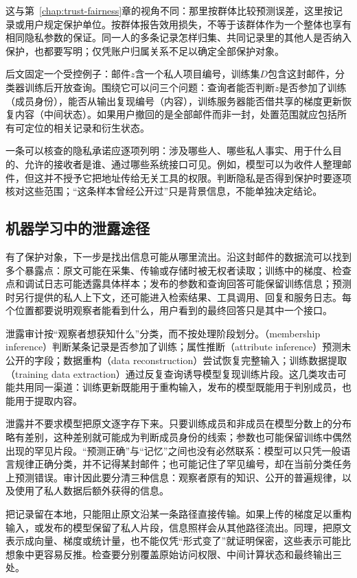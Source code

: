 这与第~\ref{chap:trust-fairness}章的视角不同：那里按群体比较预测误差，这里按记录或用户规定保护单位。按群体报告效用损失，不等于该群体作为一个整体也享有相同隐私参数的保证。同一人的多条记录怎样归集、共同记录里的其他人是否纳入保护，也都要写明；仅凭账户归属关系不足以确定全部保护对象。

后文固定一个受控例子：邮件$z$含一个私人项目编号，训练集$D$包含这封邮件，分类器训练后开放查询。围绕它可以问三个问题：查询者能否判断$z$是否参加了训练（成员身份），能否从输出复现编号（内容），训练服务器能否借共享的梯度更新恢复内容（中间状态）。如果用户撤回的是全部邮件而非一封，处置范围就应包括所有可定位的相关记录和衍生状态。

一条可以核查的隐私承诺应逐项列明：涉及哪些人、哪些私人事实、用于什么目的、允许的接收者是谁、通过哪些系统接口可见。例如，模型可以为收件人整理邮件，但这并不授予它把地址传给无关工具的权限。判断隐私是否得到保护时要逐项核对这些范围；“这条样本曾经公开过”只是背景信息，不能单独决定结论。

\subsection{机器学习中的泄露途径}
\label{sec:privacy-leakage-channels}

有了保护对象，下一步是找出信息可能从哪里流出。沿这封邮件的数据流可以找到多个暴露点：原文可能在采集、传输或存储时被无权者读取；训练中的梯度、检查点和调试日志可能透露具体样本；发布的参数和查询回答可能保留训练信息；预测时另行提供的私人上下文，还可能进入检索结果、工具调用、回复和服务日志。每个位置都要说明观察者能看到什么，用户看到的最终回答只是其中一个接口。

泄露审计按“观察者想获知什么”分类，而不按处理阶段划分。（membership inference）判断某条记录是否参加了训练；属性推断（attribute inference）预测未公开的字段；数据重构（data reconstruction）尝试恢复完整输入；训练数据提取（training data extraction）通过反复查询诱导模型复现训练片段。这几类攻击可能共用同一渠道：训练更新既能用于重构输入，发布的模型既能用于判别成员，也能用于提取内容。

泄露并不要求模型把原文逐字存下来。只要训练成员和非成员在模型分数上的分布略有差别，这种差别就可能成为判断成员身份的线索；参数也可能保留训练中偶然出现的罕见片段。“预测正确”与“记忆”之间也没有必然联系：模型可以只凭一般语言规律正确分类，并不记得某封邮件；也可能记住了罕见编号，却在当前分类任务上预测错误。审计因此要分清三种信息：观察者原有的知识、公开的普遍规律，以及使用了私人数据后额外获得的信息。

把记录留在本地，只能阻止原文沿某一条路径直接传输。如果上传的梯度足以重构输入，或发布的模型保留了私人片段，信息照样会从其他路径流出。同理，把原文表示成向量、梯度或统计量，也不能仅凭“形式变了”就证明保密，这些表示可能比想象中更容易反推。检查要分别覆盖原始访问权限、中间计算状态和最终输出三处。

